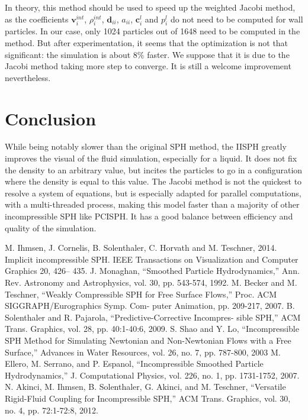 \documentclass[acmtog, authorversion]{acmart}
\begin{document}
In theory, this method should be used to speed up the weighted Jacobi method, as the coefficients $\textbf{v}_{i}^{int}$, $\rho_i^{int}$, $\textbf{d}_{ii}$, $a_{ii}$, $\textbf{c}_i^l$ and $p_i^l$ do not need to be computed for wall particles.
In our case, only 1024 particles out of 1648 need to be computed in the method.
But after experimentation, it seems that the optimization is not that significant: the simulation is about 8\% faster. We suppose that it is due to the Jacobi method taking more step to converge. It is still a welcome improvement nevertheless.

\section{Conclusion}

While being notably slower than the original SPH method, the IISPH greatly improves the visual of the fluid simulation, especially for a liquid. It does not fix the density to an arbitrary value, but incites the particles to go in a configuration where the density is equal to this value.
The Jacobi method is not the quickest to resolve a system of equations, but is especially adapted for parallel computations, with a multi-threaded process, making this model faster than a majority of other incompressible SPH like PCISPH. It has a good balance between efficiency and quality of the simulation.


\begin{thebibliography}{99}
 M. Ihmsen, J. Cornelis, B. Solenthaler, C. Horvath
and M. Teschner, 2014. Implicit incompressible SPH. IEEE
Transactions on Visualization and Computer Graphics 20, 426–
435.
 J. Monaghan, “Smoothed Particle Hydrodynamics,” Ann. Rev.
Astronomy and Astrophysics, vol. 30, pp. 543-574, 1992.
 M. Becker and M. Teschner, “Weakly Compressible SPH for Free
Surface Flows,” Proc. ACM SIGGRAPH/Eurographics Symp. Com-
puter Animation, pp. 209-217, 2007.
 B. Solenthaler and R. Pajarola, “Predictive-Corrective Incompres-
sible SPH,” ACM Trans. Graphics, vol. 28, pp. 40:1-40:6, 2009.
 S. Shao and Y. Lo, “Incompressible SPH Method for Simulating
Newtonian and Non-Newtonian Flows with a Free Surface,”
Advances in Water Resources, vol. 26, no. 7, pp. 787-800, 2003
 M. Ellero, M. Serrano, and P. Espanol, “Incompressible Smoothed
Particle Hydrodynamics,” J. Computational Physics, vol. 226, no. 1,
pp. 1731-1752, 2007.
 N. Akinci, M. Ihmsen, B. Solenthaler, G. Akinci, and M. Teschner,
“Versatile Rigid-Fluid Coupling for Incompressible SPH,” ACM
Trans. Graphics, vol. 30, no. 4, pp. 72:1-72:8, 2012.

\end{thebibliography}
\end{document}
